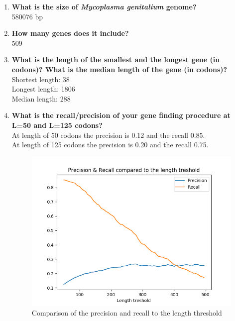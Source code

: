 \documentclass[a4paper,11pt]{article}
\begin{document}
\begin{enumerate}
    \item \textbf{What is the size of \textit{Mycoplasma genitalium} genome?}
    \\580076 bp
    \item \textbf{How many genes does it include?}
    \\509
    \item \textbf{What is the length of the smallest and the longest gene (in codons)? What is the median length of the gene (in codons)?}
    \\Shortest length: 38
    \\Longest length:  1806
    \\Median length:   288
    \item \textbf{What is the recall/precision of your gene finding procedure at L=50 and L=125 codons?}
    \\At length of 50 codons the precision is 0.12 and the recall 0.85.
    \\At length of 125 codons the precision is 0.20 and the recall 0.75.

    \begin{figure}[htbp]
    \begin{center}
    \includegraphics[scale=1.0]{plot.png}
    \caption{Comparison of the precision and recall to the length threshold}
    \label{fig-example}
    \end{center}
    \end{figure}
\end{enumerate}
\end{document}
